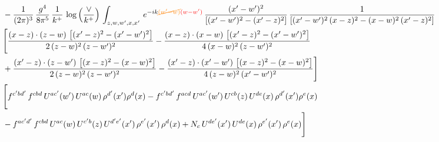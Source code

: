 \documentclass[9pt]{article}
\numberwithin{equation}{section}
\begin{document}
\begin{align}
& -\frac{1}{(2\pi)^{3}}\, \frac{g^{4}}{8\pi^{5}}\,\frac{1}{k^{+}}\,\log{\left(\frac{\vee}{k^{+}}\right)}\,\int_{z,w,w^{\prime},x,x'}\, e^{-ik{\color{orange}\cancel{(w^{\prime}-w)}}{\color{red}(w-w^{\prime})}}\, \frac{(x'-w')^{2}}{\left[(x'-w')^{2}-(x'-z)^{2}\right]}\, \frac{1}{\left[(x'-w')^{2}\, (x-z)^{2} - (x-w)^{2}\, (x'-z)^{2}\right]}  \notag \\ & \Bigg[\frac{(x-z)\cdot (z-w)\, \left[(x'-z)^{2}-(x'-w')^{2}\right]}{2\, (z-w)^{2}\, (z-w')^{2}}  - \frac{(x-z)\cdot (x-w)\,\left[(x'-z)^{2}-(x'-w')^{2}\right] }{4\,(x-w)^{2}\,(z-w')^{2}}\notag \\ & +\frac{(x'-z)\cdot (z-w')\, \left[(x-z)^{2}-(x-w)^{2}\right]}{2\, (z-w)^{2}\, (z-w')^{2}}-\frac{(x'-z)\cdot (x'-w')\, \left[(x-z)^{2}-(x-w)^{2}\right]}{4\, (z-w)^{2}\,(x'-w')^{2}}\Bigg]\notag \\ & \Bigg[f^{c'bd'}\,f^{cbd}\, U^{ac'}(w')\,U^{ac}(w)\,\rho^{d'}(x')\rho^{d}(x)- f^{c'bd'}\,f^{acd}\,U^{ac'}(w')\,U^{cb}(z)\,U^{de}(x)\,\rho^{d'}(x')\rho^{e}(x) \notag \\ & -f^{ac'd'}\,f^{cbd}\,U^{ac}(w)\,U^{c'b}(z)\,U^{d'e'}(x')\,\rho^{e'}(x')\,\rho^{d}(x) +N_{c}\,U^{de'}(x')\,U^{de}(x)\,\rho^{e'}(x')\,\rho^{e}(x)\Bigg]
\end{align}
\end{document}
